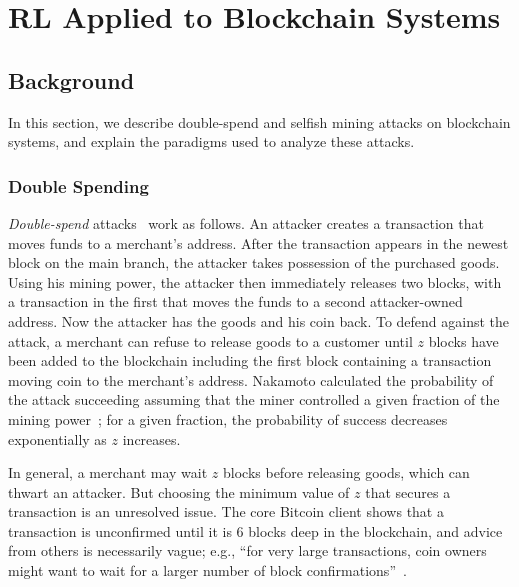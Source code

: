 \chapter{RL Applied to Blockchain Systems}\label{selfishRL}

\section{Background}
In this section, we describe double-spend and selfish mining attacks on blockchain systems, and explain the paradigms used to analyze these attacks.

\subsection{Double Spending} 
{\em Double-spend} attacks~\cite{Nakamoto:2009} work as follows. An attacker creates a transaction that moves
funds to a merchant's address. After the transaction appears in the
newest block on the main branch, the attacker takes possession of the purchased
goods. Using his mining power, the attacker then immediately releases
two blocks, with a transaction in the first that moves the funds to a
second attacker-owned address. Now the attacker has the goods and his
coin back. To defend against the attack, a merchant can refuse to
release goods to a customer until $z$ blocks have been
added to the blockchain including the first block containing a
transaction moving coin to the merchant's address.  Nakamoto
calculated the probability of the attack succeeding assuming that the
miner controlled a given fraction of the mining power~\cite{Nakamoto:2009};
for a given fraction, the probability of success decreases exponentially as $z$
increases. 

In general, a merchant may wait $z$ blocks before releasing goods,
which can thwart an attacker.
But choosing the minimum value of $z$ that secures a transaction is an
unresolved issue. The core Bitcoin client shows that a transaction is
unconfirmed until it is 6 blocks deep in the
blockchain\cite{bitcoin:confirmation}, and   advice from others is necessarily vague; e.g., ``for very large transactions, coin
owners might want to wait for a larger number of block
confirmations''~\cite{Bonneau:2015a}.   

